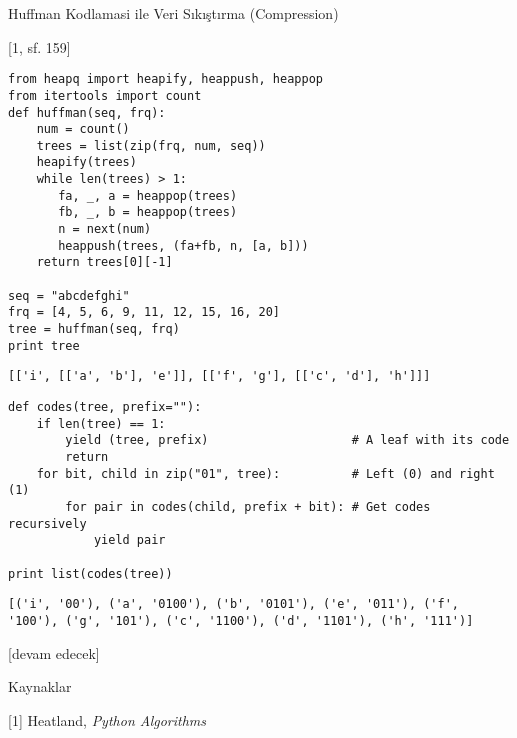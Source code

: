 \documentclass[12pt,fleqn]{article}\usepackage{../../common}
\begin{document}
Huffman Kodlamasi ile Veri Sıkıştırma (Compression)

[1, sf. 159]

\begin{verbatim}
from heapq import heapify, heappush, heappop
from itertools import count
def huffman(seq, frq):
    num = count()
    trees = list(zip(frq, num, seq))
    heapify(trees)
    while len(trees) > 1:
       fa, _, a = heappop(trees)
       fb, _, b = heappop(trees)
       n = next(num)
       heappush(trees, (fa+fb, n, [a, b]))
    return trees[0][-1]

seq = "abcdefghi"
frq = [4, 5, 6, 9, 11, 12, 15, 16, 20]
tree = huffman(seq, frq)
print tree
\end{verbatim}

\begin{verbatim}
[['i', [['a', 'b'], 'e']], [['f', 'g'], [['c', 'd'], 'h']]]
\end{verbatim}

\begin{verbatim}
def codes(tree, prefix=""):
    if len(tree) == 1:
        yield (tree, prefix)                    # A leaf with its code
        return
    for bit, child in zip("01", tree):          # Left (0) and right (1)
        for pair in codes(child, prefix + bit): # Get codes recursively
            yield pair
	    
print list(codes(tree))
\end{verbatim}

\begin{verbatim}
[('i', '00'), ('a', '0100'), ('b', '0101'), ('e', '011'), ('f', '100'), ('g', '101'), ('c', '1100'), ('d', '1101'), ('h', '111')]
\end{verbatim}

[devam edecek]


Kaynaklar

[1] Heatland, {\em Python Algorithms}
\end{document}
